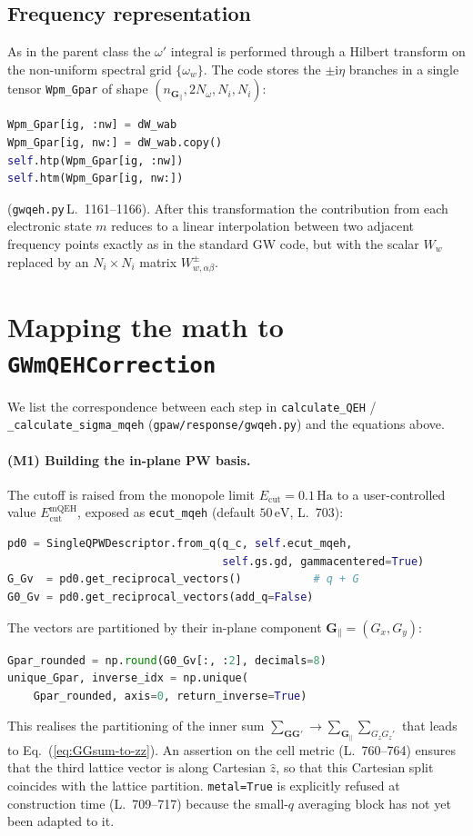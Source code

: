 \documentclass[11pt,a4paper]{article}
\newcommand{\GG}{\mathbf{G}}
\newcommand{\Gpar}{\mathbf{G}_{\!\parallel}}
\newcommand{\Gz}{G_{z}}
\newcommand{\im}{\mathrm{i}}
\newcommand{\eq}[1]{Eq.~(\ref{eq:#1})}
\begin{document}
\subsection{Frequency representation}

As in the parent class the $\omega'$ integral is performed through a
Hilbert transform on the non-uniform spectral grid $\{\omega_w\}$.
The code stores the $\pm\im\eta$ branches in a single tensor
\texttt{Wpm\_Gpar} of shape $(n_{\Gpar},2N_\omega,N_i,N_i)$:
\begin{lstlisting}[language=Python]
Wpm_Gpar[ig, :nw] = dW_wab
Wpm_Gpar[ig, nw:] = dW_wab.copy()
self.htp(Wpm_Gpar[ig, :nw])
self.htm(Wpm_Gpar[ig, nw:])
\end{lstlisting}
(\texttt{gwqeh.py}\,L.~1161--1166).  After this transformation the
contribution from each electronic state $m$ reduces to a linear
interpolation between two adjacent frequency points exactly as in the
standard GW code, but with the scalar $W_w$ replaced by an
$N_i\!\times\!N_i$ matrix $W^{\pm}_{w,\alpha\beta}$.

\section{Mapping the math to \texttt{GWmQEHCorrection}}

We list the correspondence between each step in
\texttt{calculate\_QEH} / \texttt{\_calculate\_sigma\_mqeh}
(\texttt{gpaw/response/gwqeh.py}) and the equations above.

\paragraph{(M1) Building the in-plane PW basis.}
The cutoff is raised from the monopole limit
$E_\text{cut}=0.1\,\text{Ha}$ to a user-controlled value
$E_\text{cut}^{\text{mQEH}}$, exposed as
\texttt{ecut\_mqeh} (default $50\,\text{eV}$, L.~703):
\begin{lstlisting}[language=Python]
pd0 = SingleQPWDescriptor.from_q(q_c, self.ecut_mqeh,
                                 self.gs.gd, gammacentered=True)
G_Gv  = pd0.get_reciprocal_vectors()           # q + G
G0_Gv = pd0.get_reciprocal_vectors(add_q=False)
\end{lstlisting}
The vectors are partitioned by their in-plane component
$\Gpar=(G_x,G_y)$:
\begin{lstlisting}[language=Python]
Gpar_rounded = np.round(G0_Gv[:, :2], decimals=8)
unique_Gpar, inverse_idx = np.unique(
    Gpar_rounded, axis=0, return_inverse=True)
\end{lstlisting}
This realises the partitioning of the inner sum
$\sum_{\GG\GG'}\rightarrow \sum_{\Gpar}\sum_{\Gz\Gz'}$ that leads to
\eq{GGsum-to-zz}.  An assertion on the cell metric (L.~760--764)
ensures that the third lattice vector is along Cartesian $\hat z$, so
that this Cartesian split coincides with the lattice partition.
\texttt{metal=True} is explicitly refused at construction time
(L.~709--717) because the small-$q$ averaging block has not yet been
adapted to it.
\end{document}

